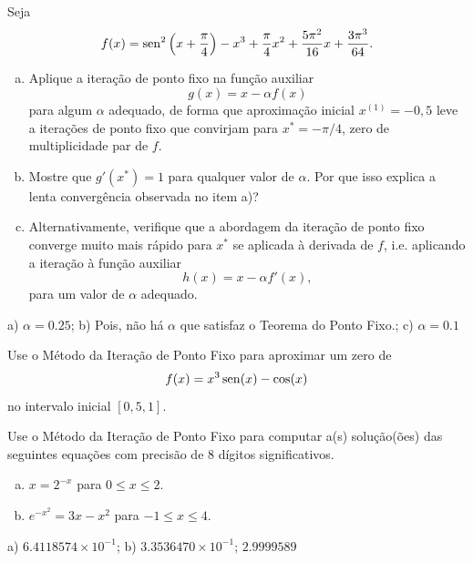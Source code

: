 \begin{exer}
  Seja
  \begin{equation}
    f(x) = \operatorname{sen}^2\left(x+\frac{\pi}{4}\right) - x^3 + \frac{\pi}{4}x^2 + \frac{5\pi^2}{16}x + \frac{3\pi^3}{64}.
  \end{equation}
  \begin{enumerate}[a)]
  \item Aplique a iteração de ponto fixo na função auxiliar
    \begin{equation}
      g(x) = x - \alpha f(x)
    \end{equation}
    para algum $\alpha$ adequado, de forma que aproximação inicial $x^{(1)}=-0,5$ leve a iterações de ponto fixo que convirjam para $x^*=-\pi/4$, zero de multiplicidade par de $f$.
  \item Mostre que $g'(x^*) = 1$ para qualquer valor de $\alpha$. Por que isso explica a lenta convergência observada no item a)?
  \item Alternativamente, verifique que a abordagem da iteração de ponto fixo converge muito mais rápido para $x^*$ se aplicada à derivada de $f$, i.e. aplicando a iteração à função auxiliar
    \begin{equation}
      h(x) = x - \alpha f'(x),
    \end{equation}
    para um valor de $\alpha$ adequado.
  \end{enumerate}
\end{exer}
\begin{resp}
  a) $\alpha = 0.25$; b) Pois, não há $\alpha$ que satisfaz o Teorema do Ponto Fixo.; c) $\alpha = 0.1$
\end{resp}

\begin{exer}
  Use o Método da Iteração de Ponto Fixo para aproximar um zero de
  \begin{equation}
    f(x)=x^3\operatorname{sen}(x)-\cos(x)
  \end{equation}
  no intervalo inicial $[0,5, 1]$.
\end{exer}

\begin{exer}
  Use o Método da Iteração de Ponto Fixo para computar a(s) solução(ões) das seguintes equações com precisão de 8 dígitos significativos.
  \begin{enumerate}[a)]
  \item $x = 2^{-x}$ para $0\leq x \leq 2$.
  \item $e^{-x^2} = 3x - x^2$ para $-1\leq x\leq 4$.
  \end{enumerate}
\end{exer}
\begin{resp}
  a) $6.4118574\times 10^{-1}$; b) $3.3536470\times 10^{-1}$; $2.9999589$
\end{resp}

